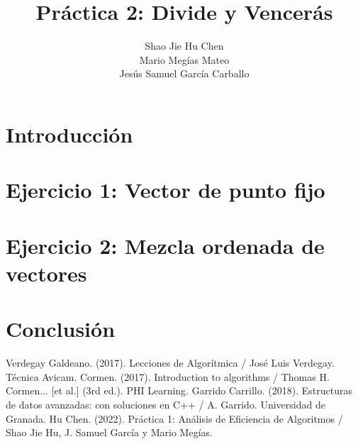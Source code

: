 \documentclass{homework}
\title{Práctica 2: Divide y Vencerás}
\author{Shao Jie Hu Chen \\ Mario Megías Mateo \\ Jesús Samuel García Carballo}
\begin{document}
    \renewcommand{\refname}{Bibliografía}
    \renewcommand{\contentsname}{Índice de Contenidos}
    \renewcommand{\listtablename}{Lista de Tablas}
    
    \maketitle
    \tableofcontents
    \newpage

    \section{Introducción}
    
    \newpage

    \section{Ejercicio 1: Vector de punto fijo}
    
    \newpage
    
    \section{Ejercicio 2: Mezcla ordenada de vectores}
    
    \newpage

    \section{Conclusión}
    
    \newpage

    \newpage
    \begin{thebibliography}{0}
         Verdegay Galdeano. (2017). Lecciones de Algorítmica / José Luis Verdegay. Técnica Avicam.
         Cormen. (2017). Introduction to algorithms / Thomas H. Cormen... [et al.] (3rd ed.). PHI Learning.
         Garrido Carrillo. (2018). Estructuras de datos avanzadas: con soluciones en C++ / A. Garrido. Universidad de Granada.  
         Hu Chen. (2022). Práctica 1: Análisis de Eficiencia de Algoritmos / Shao Jie Hu, J. Samuel García y Mario Megías.      
    \end{thebibliography}
\end{document}
